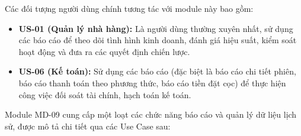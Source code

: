 \label{sssec:md09_primary_users}
Các đối tượng người dùng chính tương tác với module này bao gồm:
\begin{itemize}
    \item \textbf{US-01 (Quản lý nhà hàng):} Là người dùng thường xuyên nhất, sử dụng các báo cáo để theo dõi tình hình kinh doanh, đánh giá hiệu suất, kiểm soát hoạt động và đưa ra các quyết định chiến lược.
    \item \textbf{US-06 (Kế toán):} Sử dụng các báo cáo (đặc biệt là báo cáo chi tiết phiên, báo cáo thanh toán theo phương thức, báo cáo tiền đặt cọc) để thực hiện công việc đối soát tài chính, hạch toán kế toán.
\end{itemize}

\label{sssec:md09_key_functionalities}
Module MD-09 cung cấp một loạt các chức năng báo cáo và quản lý dữ liệu lịch sử, được mô tả chi tiết qua các Use Case sau:

